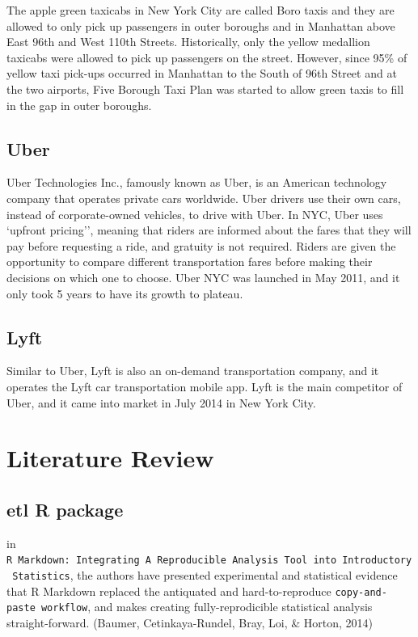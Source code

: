 \documentclass[12pt,twoside]{reedthesis}
\theoremstyle{definition}
\theoremstyle{definition}
\theoremstyle{definition}
\theoremstyle{remark}
\begin{document}
The apple green taxicabs in New York City are called Boro taxis and they
are allowed to only pick up passengers in outer boroughs and in
Manhattan above East 96th and West 110th Streets. Historically, only the
yellow medallion taxicabs were allowed to pick up passengers on the
street. However, since 95\% of yellow taxi pick-ups occurred in
Manhattan to the South of 96th Street and at the two airports, Five
Borough Taxi Plan was started to allow green taxis to fill in the gap in
outer boroughs.

\subsection{Uber}\label{uber}

Uber Technologies Inc., famously known as Uber, is an American
technology company that operates private cars worldwide. Uber drivers
use their own cars, instead of corporate-owned vehicles, to drive with
Uber. In NYC, Uber uses `upfront pricing'', meaning that riders are
informed about the fares that they will pay before requesting a ride,
and gratuity is not required. Riders are given the opportunity to
compare different transportation fares before making their decisions on
which one to choose. Uber NYC was launched in May 2011, and it only took
5 years to have its growth to plateau.

\subsection{Lyft}\label{lyft}

Similar to Uber, Lyft is also an on-demand transportation company, and
it operates the Lyft car transportation mobile app. Lyft is the main
competitor of Uber, and it came into market in July 2014 in New York
City.

\section{Literature Review}\label{literature-review}

\subsection{etl R package}\label{etl-r-package}

in
\texttt{R\ Markdown:\ Integrating\ A\ Reproducible\ Analysis\ Tool\ into\ Introductory\ Statistics},
the authors have presented experimental and statistical evidence that R
Markdown replaced the antiquated and hard-to-reproduce
\texttt{copy-and-paste\ workflow}, and makes creating fully-reprodicible
statistical analysis straight-forward. (Baumer, Cetinkaya-Rundel, Bray,
Loi, \& Horton, 2014)
\end{document}
